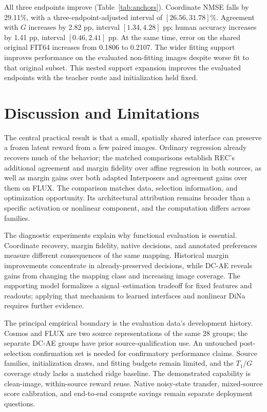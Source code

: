 \documentclass[10pt,twocolumn,letterpaper]{article}
\begin{document}
All three endpoints improve (Table~\ref{tab:anchors}). Coordinate NMSE falls by 29.11\%, with a three-endpoint-adjusted interval of $[26.56,31.78]\%$. Agreement with $G$ increases by 2.82 pp, interval $[1.34,4.28]$ pp; human accuracy increases by 1.41 pp, interval $[0.46,2.41]$ pp. At the same time, error on the shared original FIT64 increases from 0.1806 to 0.2107. The wider fitting support improves performance on the evaluated non-fitting images despite worse fit to that original subset. This nested support expansion improves the evaluated endpoints with the teacher route and initialization held fixed.

\section{Discussion and Limitations}
The central practical result is that a small, spatially shared interface can preserve a frozen latent reward from a few paired images. Ordinary regression already recovers much of the behavior; the matched comparisons establish REC's additional agreement and margin fidelity over affine regression in both sources, as well as margin gains over both adapted Interposers and agreement gains over them on FLUX. The comparison matches data, selection information, and optimization opportunity. Its architectural attribution remains broader than a specific activation or nonlinear component, and the computation differs across families.

The diagnostic experiments explain why functional evaluation is essential. Coordinate recovery, margin fidelity, native decisions, and annotated preferences measure different consequences of the same mapping. Historical margin improvements concentrate in already-preserved decisions, while DC-AE reveals gains from changing the mapping class and increasing image coverage. The supporting model formalizes a signal--estimation tradeoff for fixed features and readouts; applying that mechanism to learned interfaces and nonlinear DiNa requires further evidence.

The principal empirical boundary is the evaluation data's development history. Cosmos and FLUX are two source representations of the same 28 groups; the separate DC-AE groups have prior source-qualification use. An untouched post-selection confirmation set is needed for confirmatory performance claims. Source families, initialization draws, and fitting budgets remain limited, and the $T_1/G$ coverage study lacks a matched ridge baseline. The demonstrated capability is clean-image, within-source reward reuse. Native noisy-state transfer, mixed-source score calibration, and end-to-end compute savings remain separate deployment questions.
\end{document}
